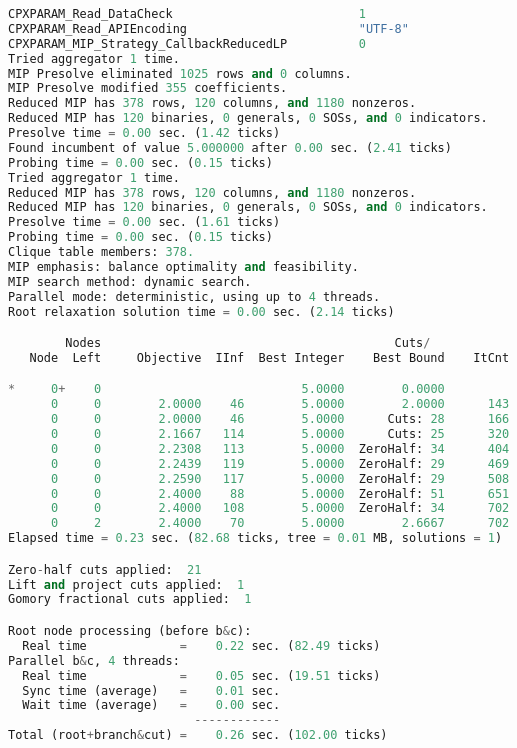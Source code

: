 \begin{lstlisting}[language=Python]
CPXPARAM_Read_DataCheck                          1
CPXPARAM_Read_APIEncoding                        "UTF-8"
CPXPARAM_MIP_Strategy_CallbackReducedLP          0
Tried aggregator 1 time.
MIP Presolve eliminated 1025 rows and 0 columns.
MIP Presolve modified 355 coefficients.
Reduced MIP has 378 rows, 120 columns, and 1180 nonzeros.
Reduced MIP has 120 binaries, 0 generals, 0 SOSs, and 0 indicators.
Presolve time = 0.00 sec. (1.42 ticks)
Found incumbent of value 5.000000 after 0.00 sec. (2.41 ticks)
Probing time = 0.00 sec. (0.15 ticks)
Tried aggregator 1 time.
Reduced MIP has 378 rows, 120 columns, and 1180 nonzeros.
Reduced MIP has 120 binaries, 0 generals, 0 SOSs, and 0 indicators.
Presolve time = 0.00 sec. (1.61 ticks)
Probing time = 0.00 sec. (0.15 ticks)
Clique table members: 378.
MIP emphasis: balance optimality and feasibility.
MIP search method: dynamic search.
Parallel mode: deterministic, using up to 4 threads.
Root relaxation solution time = 0.00 sec. (2.14 ticks)

        Nodes                                         Cuts/
   Node  Left     Objective  IInf  Best Integer    Best Bound    ItCnt     Gap

*     0+    0                            5.0000        0.0000           100.00%
      0     0        2.0000    46        5.0000        2.0000      143   60.00%
      0     0        2.0000    46        5.0000      Cuts: 28      166   60.00%
      0     0        2.1667   114        5.0000      Cuts: 25      320   56.67%
      0     0        2.2308   113        5.0000  ZeroHalf: 34      404   55.38%
      0     0        2.2439   119        5.0000  ZeroHalf: 29      469   55.12%
      0     0        2.2590   117        5.0000  ZeroHalf: 29      508   54.82%
      0     0        2.4000    88        5.0000  ZeroHalf: 51      651   52.00%
      0     0        2.4000   108        5.0000  ZeroHalf: 34      702   52.00%
      0     2        2.4000    70        5.0000        2.6667      702   46.67%
Elapsed time = 0.23 sec. (82.68 ticks, tree = 0.01 MB, solutions = 1)

Zero-half cuts applied:  21
Lift and project cuts applied:  1
Gomory fractional cuts applied:  1

Root node processing (before b&c):
  Real time             =    0.22 sec. (82.49 ticks)
Parallel b&c, 4 threads:
  Real time             =    0.05 sec. (19.51 ticks)
  Sync time (average)   =    0.01 sec.
  Wait time (average)   =    0.00 sec.
                          ------------
Total (root+branch&cut) =    0.26 sec. (102.00 ticks)

\end{lstlisting}